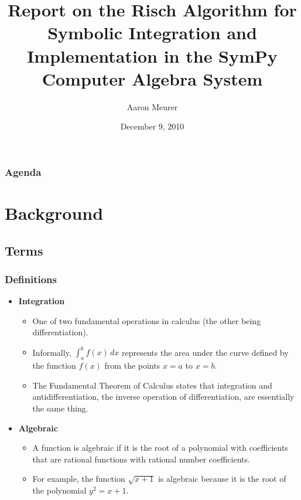 \documentclass{beamer}
\title{Report on the Risch Algorithm for Symbolic
Integration and Implementation in the SymPy Computer Algebra System}
\author{Aaron Meurer}
\date{December 9, 2010}
\numberwithin{equation}{section} %
\begin{document}
\begin{frame}
    \titlepage
\end{frame}

\begin{frame} 
    \frametitle{Agenda} 
    \tableofcontents 
\end{frame} 

\section{Background}
\subsection{Terms}

\begin{frame}
    \frametitle{Definitions}
    \begin{itemize}
        \item {\bf Integration} 
        \begin{itemize}
            \item One of two fundamental operations in calculus (the other
            being differentiation).
            \item Informally, $\int_a^b{f(x)\,dx}$ represents the area under
            the curve defined by the function $f(x)$ from the points $x=a$
            to $x=b$.
            \item The Fundamental Theorem of Calculus states that
            integration and antidifferentiation, the inverse operation of
            differentiation, are essentially the same thing.
            \end{itemize}
    \pause
        \item {\bf Algebraic}
        \begin{itemize}
            \item A function is algebraic if it is the root of a polynomial
            with coefficients that are rational functions with rational
            number coefficients.  
            \item For example, the function $\sqrt{x + 1}$ is algebraic
            because it is the root of the polynomial $y^2 = x + 1$. 
        \end{itemize}
    \end{itemize}
\end{frame}
\end{document}
